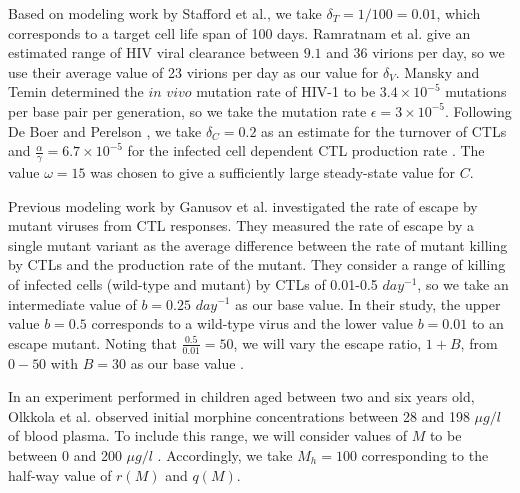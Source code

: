 \documentclass[11pt, oneside]{article}    %
\begin{document}
\vspace{5mm}

 Based on modeling work by Stafford et al.\cite{Stafford}, we take $\delta_T = 1/100 = 0.01$, which corresponds to a target cell life span of 100 days. Ramratnam et al.\cite{Ramratnam} give an estimated range of HIV viral clearance between $9.1$ and $36$ virions per day, so we use their average value of 23 virions per day as our value for $\delta_V$. Mansky and Temin \cite{Mansky} determined the $in$ $vivo$ mutation rate of HIV-1 to be $3.4 \times 10^{-5}$ mutations per base pair per generation, so we take the mutation rate $\epsilon= 3 \times 10^{-5}$. Following De Boer and Perelson \cite{De Boer}, we take $\delta_C = 0.2$ as an estimate for the turnover of CTLs and $\frac{\alpha}{\gamma} = 6.7 \times 10^{-5}$ for the infected cell dependent CTL production rate . The value $\omega = 15$ was chosen to give a sufficiently large steady-state value for $C$.

\vspace{5mm}

Previous modeling work by Ganusov et al.\cite{Ganusov2011} investigated the rate of escape by mutant viruses from CTL responses. They measured the rate of escape by a single mutant variant as the average difference between the rate of mutant killing by CTLs and the production rate of the mutant. They consider a range of killing of infected cells (wild-type and mutant) by CTLs of 0.01-0.5 $day^{-1}$, so we take an intermediate value of $b=0.25$ $day^{-1}$ as our base value. In their study, the upper value $b = 0.5$ corresponds to a wild-type virus and the lower value $b = 0.01$ to an escape mutant. Noting that $\frac{0.5}{0.01} = 50$, we will vary the escape ratio, $1+B$, from $0-50$ with $B = 30$ as our base value \cite{Ganusov2011}.


\vspace{5mm}

	In an experiment performed in children aged between two and six years old, Olkkola et al. \cite{Olkkola} observed initial morphine concentrations between 28 and 198 $\mu g/l$ of blood plasma. To include this range, we will consider values of $M$ to be between 0 and 200  $\mu g/l$ \cite{Olkkola}. Accordingly, we take $M_h=100$ corresponding to the half-way value of $r(M)$ and $q(M)$.
\end{document}
